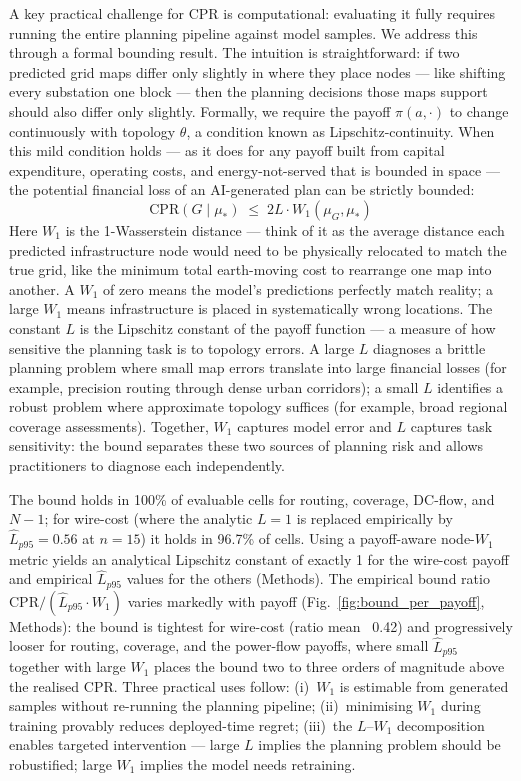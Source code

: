 \documentclass[10pt,a4paper]{article}
\begin{document}
A key practical challenge for CPR is computational: evaluating it
fully requires running the entire planning pipeline against model
samples. We address this through a formal bounding result. The
intuition is straightforward: if two predicted grid maps differ
only slightly in where they place nodes --- like shifting every
substation one block --- then the planning decisions those maps
support should also differ only slightly. Formally, we require
the payoff $\pi(a, \cdot)$ to change continuously with topology
$\theta$, a condition known as Lipschitz-continuity. When this
mild condition holds --- as it does for any payoff built from
capital expenditure, operating costs, and energy-not-served that
is bounded in space --- the potential financial loss of an
AI-generated plan can be strictly bounded:
\begin{equation}
  \mathrm{CPR}(G \mid \mu_*) \;\le\; 2 L \cdot W_1(\mu_G, \mu_*)
  \label{eq:bound}
\end{equation}
Here $W_1$ is the 1-Wasserstein distance --- think of it as the
average distance each predicted infrastructure node would need to
be physically relocated to match the true grid, like the minimum
total earth-moving cost to rearrange one map into another. A $W_1$
of zero means the model's predictions perfectly match reality; a
large $W_1$ means infrastructure is placed in systematically wrong
locations. The constant $L$ is the Lipschitz constant of the
payoff function --- a measure of how sensitive the planning task
is to topology errors. A large $L$ diagnoses a brittle planning
problem where small map errors translate into large financial
losses (for example, precision routing through dense urban
corridors); a small $L$ identifies a robust problem where
approximate topology suffices (for example, broad regional
coverage assessments). Together, $W_1$ captures model error and
$L$ captures task sensitivity: the bound separates these two
sources of planning risk and allows practitioners to diagnose each
independently.

The bound holds in 100\% of evaluable cells for routing,
coverage, DC-flow, and $N\!-\!1$; for wire-cost (where the
analytic $L = 1$ is replaced empirically by
$\hat L_{p95} = 0.56$ at $n = 15$) it holds in 96.7\% of cells.
Using a payoff-aware node-$W_1$ metric yields an analytical
Lipschitz constant of exactly 1 for the wire-cost payoff and
empirical $\hat L_{p95}$ values for the others (Methods).
The empirical bound ratio $\mathrm{CPR} / (\hat L_{p95} \cdot W_1)$
varies markedly with payoff (Fig.~\ref{fig:bound_per_payoff},
Methods): the bound is tightest for wire-cost (ratio mean ~0.42)
and progressively looser for routing, coverage, and the
power-flow payoffs, where small $\hat L_{p95}$ together with
large $W_1$ places the bound two to three orders of magnitude
above the realised CPR. Three practical uses follow:
(i)~$W_1$ is estimable from generated samples without re-running
the planning pipeline; (ii)~minimising $W_1$ during training
provably reduces deployed-time regret; (iii)~the $L$--$W_1$
decomposition enables targeted intervention --- large $L$ implies
the planning problem should be robustified; large $W_1$ implies
the model needs retraining.
\end{document}
